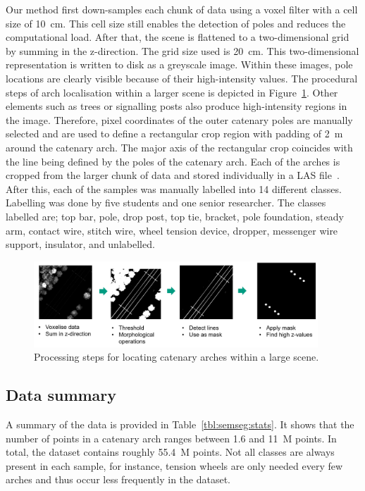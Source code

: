 Our method first down-samples each chunk of data using a voxel filter with a cell size of 10~cm. This cell size still enables the detection of poles and reduces the computational load. After that, the scene is flattened to a two-dimensional grid by summing in the z-direction. The grid size used is 20~cm. This two-dimensional representation is written to disk as a greyscale image. Within these images, pole locations are clearly visible because of their high-intensity values. The procedural steps of arch localisation within a larger scene is depicted in Figure~\ref{fig:semseg:arch_localization}. Other elements such as trees or signalling posts also produce high-intensity regions in the image. Therefore, pixel coordinates of the outer catenary poles are manually selected and are used to define a rectangular crop region with padding of 2~m around the catenary arch. The major axis of the rectangular crop coincides with the line being defined by the poles of the catenary arch. Each of the arches is cropped from the larger chunk of data and stored individually in a LAS file~\cite{LASspec}. After this, each of the samples was manually labelled into 14 different classes. Labelling was done by five students and one senior researcher. The classes labelled are; top bar, pole, drop post, top tie, bracket, pole foundation, steady arm, contact wire, stitch wire, wheel tension device, dropper, messenger wire support, insulator, and unlabelled.

\begin{figure}[ht]
    \centering
    \includegraphics[width=0.95\textwidth]{./Chapters/semseg/figs/ArchLocalization.png}
    \caption{Processing steps for locating catenary arches within a large scene.}
    \label{fig:semseg:arch_localization}
\end{figure}

\subsection{Data summary}
A summary of the data is provided in Table~\ref{tbl:semseg:stats}. It shows that the number of points in a catenary arch ranges between 1.6 and 11~M points. In total, the dataset contains roughly 55.4~M points. Not all classes are always present in each sample, for instance, tension wheels are only needed every few arches and thus occur less frequently in the dataset.

